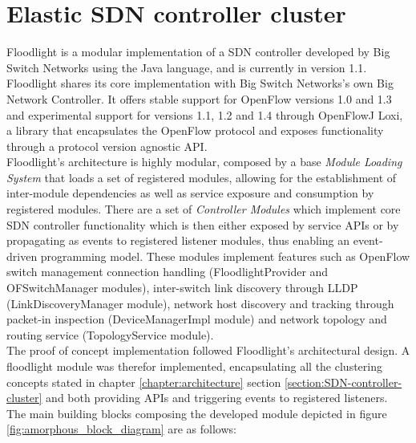\section{Elastic SDN controller cluster}
\label{section:SDN-controller-cluster-implementation}
Floodlight is a modular implementation of a \gls{SDN} controller developed by Big Switch Networks using the Java language, and is currently in version 1.1.
Floodlight shares its core implementation with Big Switch Networks's own Big Network Controller\cite{Floodlight}.
It offers stable support for OpenFlow versions 1.0 and 1.3 and experimental support for versions 1.1, 1.2 and 1.4 through OpenFlowJ Loxi, a library that encapsulates the OpenFlow protocol and exposes functionality through a protocol version agnostic \gls{API}\cite{LoxiGen}.\\
Floodlight's architecture is highly modular, composed by a base \emph{Module Loading System} that loads a set of registered modules, allowing for the establishment of inter-module dependencies as well as service exposure and consumption by registered modules\cite{FLArch}.
There are a set of \emph{Controller Modules} which implement core \gls{SDN} controller functionality which is then either exposed by service \glspl{API} or by propagating as events to registered listener modules, thus enabling an event-driven programming model.
These modules implement features such as OpenFlow switch management connection handling (FloodlightProvider and OFSwitchManager modules), inter-switch link discovery through \gls{LLDP} (LinkDiscoveryManager module), network host discovery and tracking through packet-in inspection (DeviceManagerImpl module) and network topology and routing service (TopologyService module).\\
%
The proof of concept implementation followed Floodlight's architectural design.
A floodlight module was therefor implemented, encapsulating all the clustering concepts stated in chapter \ref*{chapter:architecture} section \ref{section:SDN-controller-cluster} and both providing \glspl{API} and triggering events to registered listeners.
The main building blocks composing the developed module depicted in figure \ref{fig:amorphous_block_diagram} are as follows:
